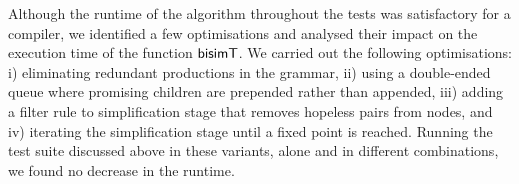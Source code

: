 Although the runtime of the algorithm throughout the tests was
satisfactory for a compiler, we identified a few optimisations and
analysed their impact on the execution time of the function
$\mathsf{bisimT}$. We carried out the following optimisations: i) eliminating
redundant productions in the grammar, ii) using a double-ended queue
where promising children are prepended rather than appended, iii)
adding a filter rule to simplification stage that removes hopeless
pairs from nodes, and iv) iterating the simplification stage until a
fixed point is reached.
%
Running the test suite discussed above in these variants, alone and
in different combinations, we found no decrease in the runtime.




